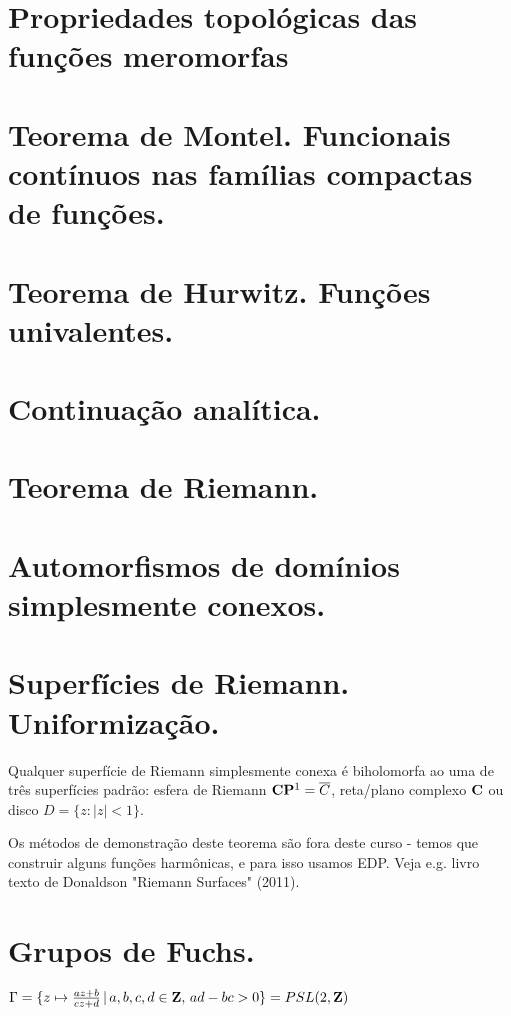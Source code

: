 \section{Propriedades topológicas das funções meromorfas}

\section{Teorema de Montel. Funcionais contínuos nas famílias compactas de funções.}

\section{Teorema de Hurwitz. Funções univalentes.}

\section{Continuação analítica.}

\section{Teorema de Riemann.}

\section{Automorfismos de domínios simplesmente conexos.}

\section{Superfícies de Riemann. Uniformização.}

\begin{teorema}
Qualquer superfície de Riemann simplesmente conexa é biholomorfa ao uma de três superfícies padrão:
esfera de Riemann $\mathbf{C}\mathbf{P}^1 = \overline{C}$, reta/plano complexo $\mathbf{C}$ ou disco $D = \{z : |z|<1\}$.
\end{teorema}
Os métodos de demonstração deste teorema são fora deste curso - temos que construir alguns funções
harmônicas, e para isso usamos EDP. Veja e.g. livro texto de Donaldson "Riemann Surfaces" (2011).

\section{Grupos de Fuchs.}

\begin{exem}
$\Gamma = \{ z \mapsto \frac{az+b}{cz+d} \,|\, a,b,c,d\in\mathbf{Z}, \, ad-bc>0 \} = PSL(2,\mathbf{Z})$
\end{exem}


